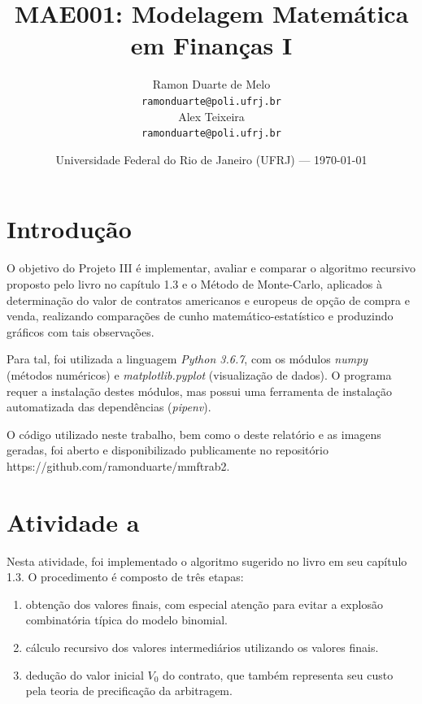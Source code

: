 \documentclass{article}
\title{MAE001: Modelagem Matemática em Finanças I} %
\author{Ramon Duarte de Melo\\ \texttt{ramonduarte@poli.ufrj.br} %
\\ Alex Teixeira\\ \texttt{ramonduarte@poli.ufrj.br}} %
\date{Universidade Federal do Rio de Janeiro (UFRJ) --- \today} %
\begin{document}
\maketitle %


\section*{Introdução} %

O objetivo do Projeto III é implementar, avaliar e comparar o algoritmo recursivo proposto pelo livro no capítulo 1.3 e o Método de Monte-Carlo, aplicados à determinação do valor de contratos americanos e europeus de opção de compra e venda, realizando comparações de cunho matemático-estatístico e produzindo gráficos com tais observações. 

Para tal, foi utilizada a linguagem \emph{Python 3.6.7}, com os módulos \emph{numpy} (métodos numéricos) e \emph{matplotlib.pyplot} (visualização de dados).
O programa requer a instalação destes módulos, mas possui uma ferramenta de instalação automatizada das dependências (\emph{pipenv}). 

O código utilizado neste trabalho, bem como o deste relatório e as imagens geradas, foi aberto e disponibilizado publicamente no repositório https://github.com/ramonduarte/mmftrab2.



\section*{Atividade a} %

Nesta atividade, foi implementado o algoritmo sugerido no livro em seu capítulo 1.3.
O procedimento é composto de três etapas:

\begin{enumerate}
	\item obtenção dos valores finais, com especial atenção para evitar a explosão combinatória típica do modelo binomial.
	\item cálculo recursivo dos valores intermediários utilizando os valores finais.
	\item dedução do valor inicial $V_{0}$ do contrato, que também representa seu custo pela teoria de precificação da arbitragem.
\end{enumerate}
\end{document}
